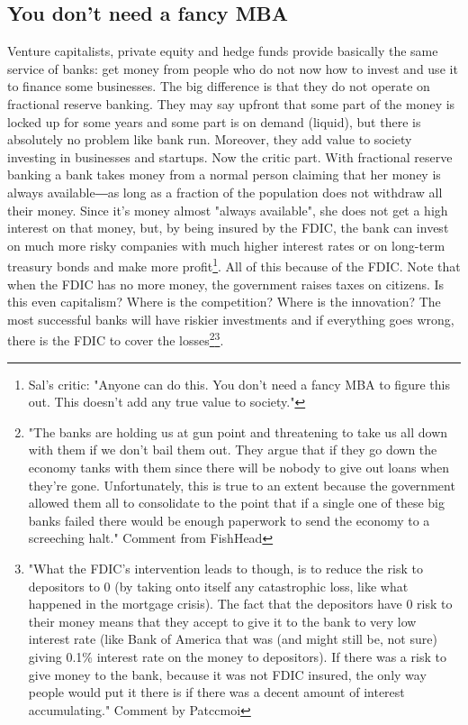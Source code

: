 \subsection{You don't need a fancy MBA}
Venture capitalists, private equity and hedge funds provide basically the same service of banks: get money from people who do not now how to invest and use it to finance some businesses. The big difference is that they do not operate on fractional reserve banking. They may say upfront that some part of the money is locked up for some years and some part is on demand (liquid), but there is absolutely no problem like bank run. Moreover, they add value to society investing in businesses and startups. Now the critic part. With fractional reserve banking a bank takes money from a normal person claiming that her money is always available―as long as a fraction of the population does not withdraw all their money. Since it's money almost "always available", she does not get a high interest on that money, but, by being insured by the FDIC, the bank can invest on much more risky companies with much higher interest rates or on long-term treasury bonds and make more profit\footnote{Sal's critic: "Anyone can do this. You don't need a fancy MBA to figure this out. This doesn't add any true value to society."}. All of this because of the FDIC. Note that when the FDIC has no more money, the government raises taxes on citizens. Is this even capitalism? Where is the competition? Where is the innovation? The most successful banks will have riskier investments and if everything goes wrong, there is the FDIC to cover the losses\footnote{"The banks are holding us at gun point and threatening to take us all down with them if we don't bail them out. They argue that if they go down the economy tanks with them since there will be nobody to give out loans when they're gone. Unfortunately, this is true to an extent because the government allowed them all to consolidate to the point that if a single one of these big banks failed there would be enough paperwork to send the economy to a screeching halt." Comment from FishHead}\footnote{"What the FDIC's intervention leads to though, is to reduce the risk to depositors to 0 (by taking onto itself any catastrophic loss, like what happened in the mortgage crisis). The fact that the depositors have 0 risk to their money means that they accept to give it to the bank to very low interest rate (like Bank of America that was (and might still be, not sure) giving 0.1\% interest rate on the money to depositors). If there was a risk to give money to the bank, because it was not FDIC insured, the only way people would put it there is if there was a decent amount of interest accumulating." Comment by Patccmoi}.

